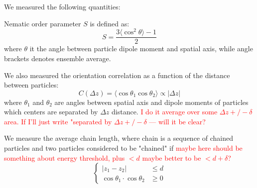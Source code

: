 We measured the following quantities:

Nematic order parameter $S$ is defined as:
\begin{equation}
\label{eq:nematic_order_parameter}
	S = \frac{3 \langle\cos^2 \theta\rangle - 1}{2}
\end{equation}
where $\theta$ it the angle between particle dipole moment and spatial axis, while angle brackets denotes ensemble average.

We also measured the orientation correlation as a function of the distance between particles:
\begin{equation}
	C(\Delta z) = \langle\cos \theta_1 \cos \theta_2\rangle \propto |\Delta z|
\end{equation}
where $\theta_1$ and $\theta_2$ are angles between spatial axis and dipole moments of particles which centers are separated by $\Delta z$ distance. \textcolor{red}{I do it average over some $\Delta z +/- \delta$ area. If I'll just write "separated by $\Delta z +/- \delta$ --- will it be clear?}

We measure the average chain length, where chain is a sequence of chained particles and two particles considered to be "chained" if 
\textcolor{red}{maybe here should be something about energy threshold, plus $<d$ maybe better to be $<d + \delta$?}
\begin{equation}
\begin{cases}
	|z_1 - z_2| &\leq d \\
	\cos \theta_1 \cdot \cos \theta_2 &\geq 0
\end{cases}
\end{equation}